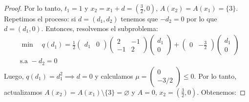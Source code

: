 \documentclass{article}
\begin{document}
\begin{proof}
    Por lo tanto, \( t_1 = 1 \) y \( x_2 = x_1 + d = \left( \frac{3}{2}, 0 \right) \), \( A(x_2) = A(x_1) = \{ 3 \} \). Repetimos el proceso: si \( d = (d_1, d_2) \) tenemos que \( -d_2 = 0 \) por lo que \( d = (d_1, 0) \). Entonces, resolvemos el
    subproblema:\begin{align*}
         & \min \quad q(d_1) = \frac{1}{2} \begin{pmatrix}
                                               d_1 & 0
                                           \end{pmatrix} \begin{pmatrix}
                                                             2  & -1 \\
                                                             -1 & 2
                                                         \end{pmatrix} \begin{pmatrix}
                                                                           d_1 \\
                                                                           0
                                                                       \end{pmatrix} + \begin{pmatrix}
                                                                                           0 & -\frac{3}{2}
                                                                                       \end{pmatrix} \begin{pmatrix}
                                                                                                         d_1 \\
                                                                                                         0
                                                                                                     \end{pmatrix} \\
         & \text{s.a } -d_2 = 0
    \end{align*}
    Luego, \( q(d_1) = d_1^2 \implies d = 0 \) y calculamos \( \mu = \begin{pmatrix}
        0 \\
        -3/2
    \end{pmatrix} \leq 0 \). Por lo tanto, actualizamos \( A(x_2) = A(x_1) \setminus \{ 3 \} = \varnothing \) y \( A = 0 \), \( x_2 = \left( \frac{3}{2}, 0 \right) \). Obtenemos:

\end{proof}
\end{document}
